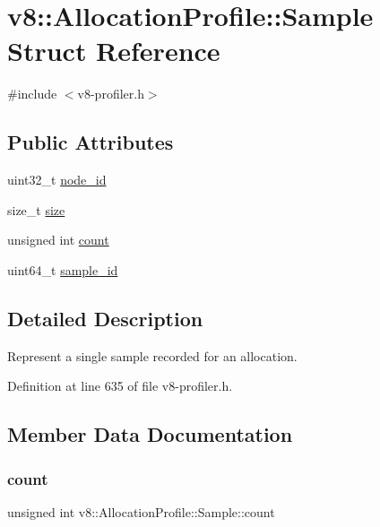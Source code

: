 \hypertarget{structv8_1_1AllocationProfile_1_1Sample}{}\section{v8\+:\+:Allocation\+Profile\+:\+:Sample Struct Reference}
\label{structv8_1_1AllocationProfile_1_1Sample}


{\ttfamily \#include $<$v8-\/profiler.\+h$>$}

\subsection*{Public Attributes}
\begin{DoxyCompactItemize}
\item 
uint32\+\_\+t \mbox{\hyperlink{structv8_1_1AllocationProfile_1_1Sample_ab84cfd942c2b6d42f25874b5008cfc35}{node\+\_\+id}}
\item 
size\+\_\+t \mbox{\hyperlink{structv8_1_1AllocationProfile_1_1Sample_aa8775ce782c6fcc5a20922f604190dd5}{size}}
\item 
unsigned int \mbox{\hyperlink{structv8_1_1AllocationProfile_1_1Sample_a0c121684db4adc4e4757b85d919bb0e7}{count}}
\item 
uint64\+\_\+t \mbox{\hyperlink{structv8_1_1AllocationProfile_1_1Sample_afc21641115d4a9684363ac873750422c}{sample\+\_\+id}}
\end{DoxyCompactItemize}


\subsection{Detailed Description}
Represent a single sample recorded for an allocation. 

Definition at line 635 of file v8-\/profiler.\+h.



\subsection{Member Data Documentation}
\mbox{\label{structv8_1_1AllocationProfile_1_1Sample_a0c121684db4adc4e4757b85d919bb0e7}} 
\subsubsection{\texorpdfstring{count}{count}}
{\footnotesize\ttfamily unsigned int v8\+::\+Allocation\+Profile\+::\+Sample\+::count}

